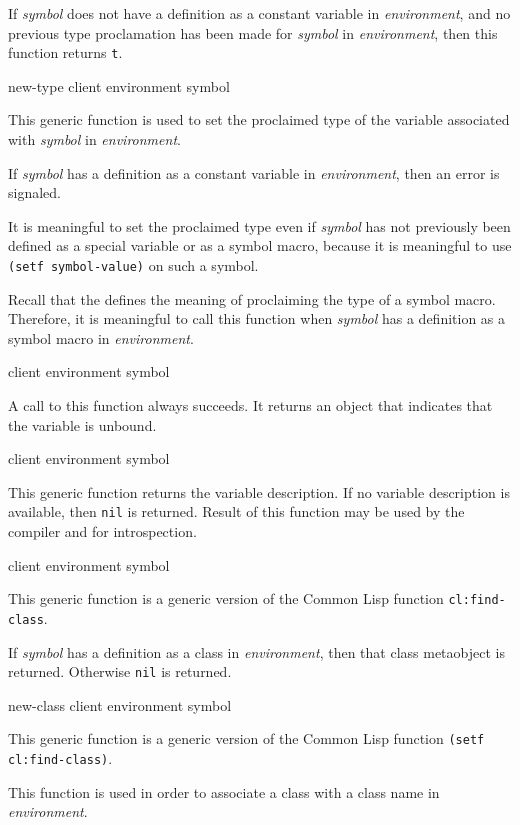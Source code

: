 If \textit{symbol} does not have a definition as a constant variable
in \textit{environment}, and no previous type proclamation has been
made for \textit{symbol} in \textit{environment}, then this function
returns \texttt{t}.

 {new-type client environment symbol}

This generic function is used to set the proclaimed type of the
variable associated with \textit{symbol} in \textit{environment}.

If \textit{symbol} has a definition as a constant variable in
\textit{environment}, then an error is signaled.

It is meaningful to set the proclaimed type even if \textit{symbol}
has not previously been defined as a special variable or as a symbol
macro, because it is meaningful to use \texttt{(setf symbol-value)} on
such a symbol.

Recall that the \hs{} defines the meaning of proclaiming the type of a
symbol macro.  Therefore, it is meaningful to call this function when
\textit{symbol} has a definition as a symbol macro in
\textit{environment}.

 {client environment symbol}

A call to this function always succeeds.  It returns an object that indicates
that the variable is unbound.

 {client environment symbol}

This generic function returns the variable description. If no variable
description is available, then \texttt{nil} is returned. Result of this
function may be used by the compiler and for introspection.

 {client environment symbol}

This generic function is a generic version of the Common Lisp function
\texttt{cl:find-class}.

If \textit{symbol} has a definition as a class in
\textit{environment}, then that class metaobject is returned.
Otherwise \texttt{nil} is returned.

 {new-class client environment symbol}

This generic function is a generic version of the Common Lisp function
\texttt{(setf cl:find-class)}.

This function is used in order to associate a class with a class name
in \textit{environment}.

